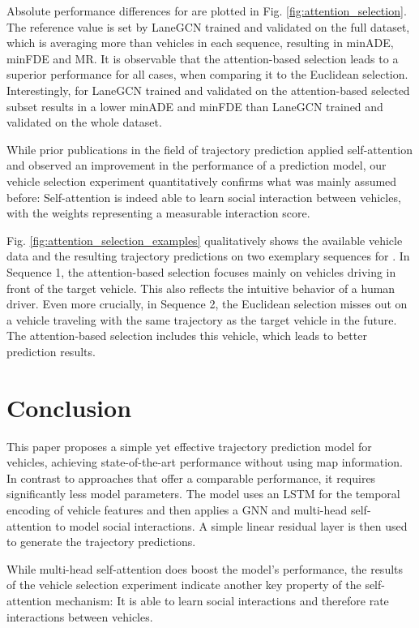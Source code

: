 \documentclass[letterpaper, 10 pt, conference]{ieeeconf}
\begin{document}
Absolute performance differences for  are plotted in Fig. \ref{fig:attention_selection}.
The reference value is set by LaneGCN trained and validated on the full dataset, which is averaging more than  vehicles in each sequence, resulting in minADE, minFDE and MR.
It is observable that the attention-based selection leads to a superior performance for all cases, when comparing it to the Euclidean selection.
Interestingly, for  LaneGCN trained and validated on the attention-based selected subset results in a lower minADE and minFDE than LaneGCN trained and validated on the whole dataset.

While prior publications in the field of trajectory prediction applied self-attention and observed an improvement in the performance of a prediction model, our vehicle selection experiment quantitatively confirms what was mainly assumed before: Self-attention is indeed able to learn social interaction between vehicles, with the weights representing a measurable interaction score.

Fig. \ref{fig:attention_selection_examples} qualitatively shows the available vehicle data and the resulting trajectory predictions on two exemplary sequences for .
In Sequence 1, the attention-based selection focuses mainly on vehicles driving in front of the target vehicle.
This also reflects the intuitive behavior of a human driver.
Even more crucially, in Sequence 2, the Euclidean selection misses out on a vehicle traveling with the same trajectory as the target vehicle in the future.
The attention-based selection includes this vehicle, which leads to better prediction results.

\section{Conclusion}
This paper proposes a simple yet effective trajectory prediction model for vehicles, achieving state-of-the-art performance without using map information.
In contrast to approaches that offer a comparable performance, it requires significantly less model parameters.
The model uses an LSTM for the temporal encoding of vehicle features and then applies a GNN and multi-head self-attention to model social interactions.
A simple linear residual layer is then used to generate the trajectory predictions.

While multi-head self-attention does boost the model's performance, the results of the vehicle selection experiment indicate another key property of the self-attention mechanism:
It is able to learn social interactions and therefore rate interactions between vehicles.
\end{document}
